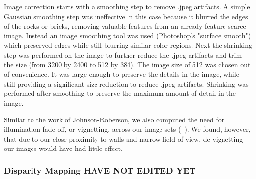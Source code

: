 \documentclass[twocolumn]{article}
\begin{document}
Image correction starts with a smoothing step  to remove .jpeg artifacts.
  A simple Gaussian smoothing step was ineffective in this case because it blurred the edges of the rocks or bricks, removing valuable features from an already feature-scarce image.
  Instead an image smoothing tool was used (Photoshop's "surface smooth") which preserved edges while still blurring similar color regions.
  Next the shrinking step was performed on the image to further reduce the .jpeg artifacts and trim the size (from 3200 by 2400 to 512 by 384).
The image size of 512 was chosen out of convenience.  It was large enough to preserve the details in the image, while still providing a significant size reduction to reduce .jpeg artifacts.   
Shrinking was performed after smoothing to preserve the maximum amount of detail in the image.

Similar to the work of Johnson-Roberson, we also computed the need for illumination fade-off, or vignetting, across our image sets (~\cite{stereo:Roberson}).  
We found, however, that due to our close proximity to walls and narrow field of view, de-vignetting our images would have had little effect.

\subsubsection{Disparity Mapping HAVE NOT EDITED YET}
\label{subsec:disparity_mapping}
\end{document}
